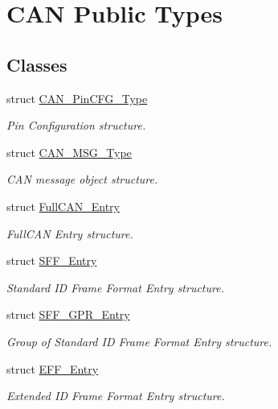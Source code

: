\hypertarget{group___c_a_n___public___types}{\section{\-C\-A\-N \-Public \-Types}
\label{group___c_a_n___public___types}
}
\subsection*{\-Classes}
\begin{DoxyCompactItemize}
\item 
struct \hyperlink{struct_c_a_n___pin_c_f_g___type}{\-C\-A\-N\-\_\-\-Pin\-C\-F\-G\-\_\-\-Type}
\begin{DoxyCompactList}\small\item\em \-Pin \-Configuration structure. \end{DoxyCompactList}\item 
struct \hyperlink{struct_c_a_n___m_s_g___type}{\-C\-A\-N\-\_\-\-M\-S\-G\-\_\-\-Type}
\begin{DoxyCompactList}\small\item\em \-C\-A\-N message object structure. \end{DoxyCompactList}\item 
struct \hyperlink{struct_full_c_a_n___entry}{\-Full\-C\-A\-N\-\_\-\-Entry}
\begin{DoxyCompactList}\small\item\em \-Full\-C\-A\-N \-Entry structure. \end{DoxyCompactList}\item 
struct \hyperlink{struct_s_f_f___entry}{\-S\-F\-F\-\_\-\-Entry}
\begin{DoxyCompactList}\small\item\em \-Standard \-I\-D \-Frame \-Format \-Entry structure. \end{DoxyCompactList}\item 
struct \hyperlink{struct_s_f_f___g_p_r___entry}{\-S\-F\-F\-\_\-\-G\-P\-R\-\_\-\-Entry}
\begin{DoxyCompactList}\small\item\em \-Group of \-Standard \-I\-D \-Frame \-Format \-Entry structure. \end{DoxyCompactList}\item 
struct \hyperlink{struct_e_f_f___entry}{\-E\-F\-F\-\_\-\-Entry}
\begin{DoxyCompactList}\small\item\em \-Extended \-I\-D \-Frame \-Format \-Entry structure. \end{DoxyCompactList}\item 

\end{DoxyCompactItemize}
